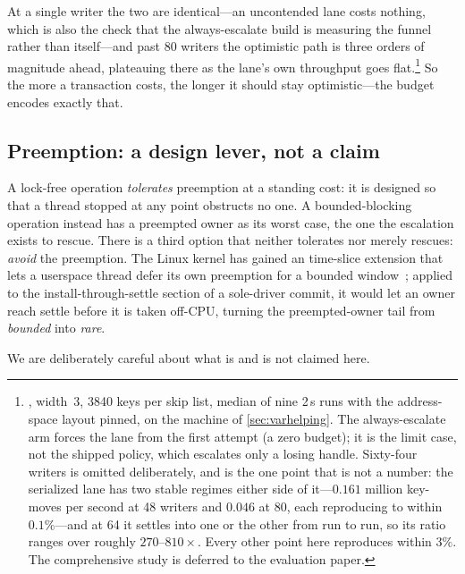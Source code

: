 \documentclass[11pt]{article}
\begin{document}
\noindent At a single writer the two are identical---an uncontended lane costs
nothing, which is also the check that the always-escalate build is measuring the
funnel rather than itself---and past 80 writers the optimistic path is three
orders of magnitude ahead, plateauing there as the lane's own throughput goes
flat.\footnote{, width~3, 3840
keys per skip list, median of nine 2\,s runs with the address-space layout
pinned, on the machine of \cref{sec:varhelping}. The always-escalate arm forces
the lane from the first attempt (a zero budget); it is the limit case, not the
shipped policy, which escalates only a losing handle. Sixty-four writers is
omitted deliberately, and is the one point that is not a number: the serialized
lane has two stable regimes either side of it---$0.161$ million key-moves per
second at 48 writers and $0.046$ at 80, each reproducing to within
$0.1\%$---and at 64 it settles into one or the other from run to run, so its
ratio ranges over roughly $270$--$810\times$. Every other point here reproduces
within $3\%$. The comprehensive study is deferred to the evaluation paper.} So the more a
transaction costs, the longer it should stay optimistic---the budget encodes
exactly that.

\subsection{Preemption: a design lever, not a claim}
\label{sec:preemption}

A lock-free operation \emph{tolerates} preemption at a standing cost: it is
designed so that a thread stopped at any point obstructs no one. A
bounded-blocking operation instead has a preempted owner as its worst case, the
one the escalation exists to rescue. There is a third option that neither
tolerates nor merely rescues: \emph{avoid} the preemption. The Linux kernel has
gained an  time-slice extension that lets a userspace thread defer its
own preemption for a bounded window~\citep{gleixner2025rseqtse}; applied to the
install-through-settle section of a sole-driver commit, it would let an owner
reach settle before it is taken off-CPU, turning the preempted-owner tail from
\emph{bounded} into \emph{rare}.

We are deliberately careful about what is and is not claimed here.
\end{document}
